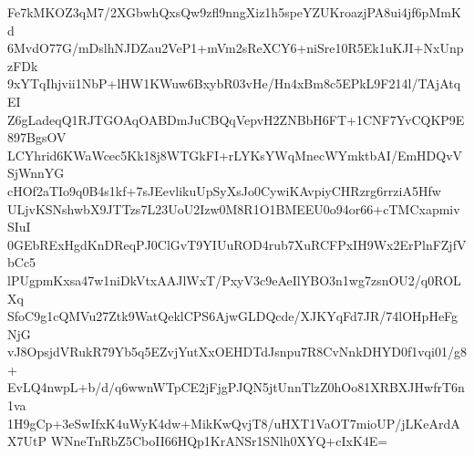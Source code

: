 Fe7kMKOZ3qM7/2XGbwhQxsQw9zfl9nngXiz1h5speYZUKroazjPA8ui4jf6pMmKd
6MvdO77G/mDslhNJDZau2VeP1+mVm2sReXCY6+niSre10R5Ek1uKJI+NxUnpzFDk
9xYTqIhjvii1NbP+lHW1KWuw6BxybR03vHe/Hn4xBm8c5EPkL9F214l/TAjAtqEI
Z6gLadeqQ1RJTGOAqOABDmJuCBQqVepvH2ZNBbH6FT+1CNF7YvCQKP9E897BgsOV
LCYhrid6KWaWcec5Kk18j8WTGkFI+rLYKsYWqMnecWYmktbAI/EmHDQvVSjWnnYG
cHOf2aTIo9q0B4s1kf+7sJEevlikuUpSyXsJo0CywiKAvpiyCHRzrg6rrziA5Hfw
ULjvKSNshwbX9JTTzs7L23UoU2Izw0M8R1O1BMEEU0o94or66+cTMCxapmivSIuI
0GEbRExHgdKnDReqPJ0ClGvT9YIUuROD4rub7XuRCFPxIH9Wx2ErPlnFZjfVbCc5
lPUgpmKxsa47w1niDkVtxAAJlWxT/PxyV3c9eAeIlYBO3n1wg7zsnOU2/q0ROLXq
SfoC9g1cQMVu27Ztk9WatQeklCPS6AjwGLDQcde/XJKYqFd7JR/74lOHpHeFgNjG
vJ8OpsjdVRukR79Yb5q5EZvjYutXxOEHDTdJsnpu7R8CvNnkDHYD0f1vqi01/g8+
EvLQ4nwpL+b/d/q6wwnWTpCE2jFjgPJQN5jtUnnTlzZ0hOo81XRBXJHwfrT6n1va
1H9gCp+3eSwIfxK4uWyK4dw+MikKwQvjT8/uHXT1VaOT7mioUP/jLKeArdAX7UtP
WNneTnRbZ5CboII66HQp1KrANSr1SNlh0XYQ+cIxK4E=
